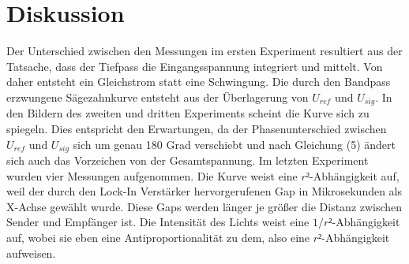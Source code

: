 \documentclass[captions=tableheading]{scrartcl}
\begin{document}
\section{Diskussion}
Der Unterschied zwischen den Messungen im ersten Experiment resultiert aus der Tatsache, dass der Tiefpass die Eingangsspannung integriert und mittelt. Von daher entsteht ein Gleichstrom statt eine Schwingung.
Die durch den Bandpass erzwungene Sägezahnkurve entsteht aus der Überlagerung von \(U_{ref}\) und \(U_{sig}\).
In den Bildern des zweiten und dritten Experiments scheint die Kurve sich zu spiegeln. Dies entspricht den Erwartungen, da der Phasenunterschied zwischen \(U_{ref}\) und \(U_{sig}\) sich um genau 180 Grad verschiebt und nach Gleichung (5) ändert sich auch das Vorzeichen von der Gesamtspannung.
Im letzten Experiment wurden vier Messungen aufgenommen.
Die Kurve weist eine \(r²\)-Abhängigkeit auf, weil der durch den Lock-In Verstärker hervorgerufenen Gap in Mikrosekunden als X-Achse gewählt wurde. Diese Gaps werden länger je größer die Distanz zwischen Sender und Empfänger ist. Die Intensität des Lichts weist eine \(1/r²\)-Abhängigkeit auf, wobei sie eben eine Antiproportionalität zu dem, also eine \(r²\)-Abhängigkeit aufweisen.
\newpage
\end{document}
